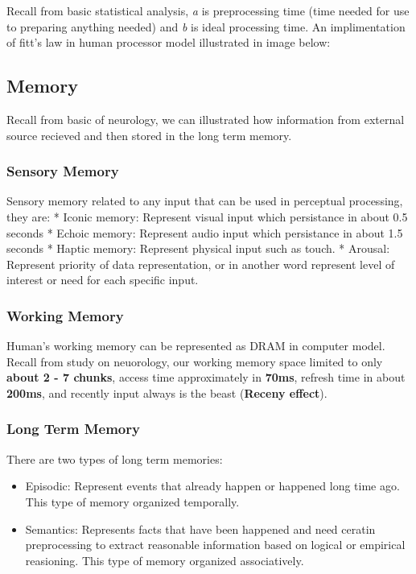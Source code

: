 \documentclass[11pt]{article}
\providecommand{\tightlist}{%
      \setlength{\itemsep}{0pt}\setlength{\parskip}{0pt}}
\begin{document}
Recall from basic statistical analysis, \emph{a} is preprocessing time
(time needed for use to preparing anything needed) and \emph{b} is ideal
processing time. An implimentation of fitt's law in human processor
model illustrated in image below:

    \subsection{Memory}\label{memory}

Recall from basic of neurology, we can illustrated how information from
external source recieved and then stored in the long term memory.

    \subsubsection{Sensory Memory}\label{sensory-memory}

Sensory memory related to any input that can be used in perceptual
processing, they are: * Iconic memory: Represent visual input which
persistance in about 0.5 seconds * Echoic memory: Represent audio input
which persistance in about 1.5 seconds * Haptic memory: Represent
physical input such as touch. * Arousal: Represent priority of data
representation, or in another word represent level of interest or need
for each specific input.

    \subsubsection{Working Memory}\label{working-memory}

Human's working memory can be represented as DRAM in computer model.
Recall from study on neuorology, our working memory space limited to
only \textbf{about 2 - 7 chunks}, access time approximately in
\textbf{70ms}, refresh time in about \textbf{200ms}, and recently input
always is the beast (\textbf{Receny effect}).

    \subsubsection{Long Term Memory}\label{long-term-memory}

There are two types of long term memories:

\begin{itemize}
\tightlist
\item
  Episodic: Represent events that already happen or happened long time
  ago. This type of memory organized temporally.
\item
  Semantics: Represents facts that have been happened and need ceratin
  preprocessing to extract reasonable information based on logical or
  empirical reasioning. This type of memory organized associatively.
\end{itemize}
\end{document}
